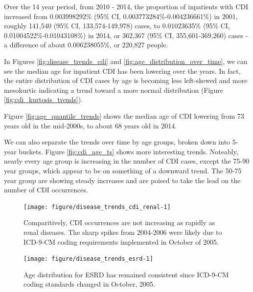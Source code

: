 \documentclass[12pt]{ociamthesis}\usepackage[]{graphicx}\usepackage[]{color}
\newenvironment{knitrout}{}{} %
\newcommand{\ci}[3]{#1 (95\% CI, #2-#3)}
\newcommand{\cip}[3]{#1\% (95\% CI, #2\%-#3\%)}
\begin{document}
Over the 14 year period, from 2010 - 2014, the proportion of inpatients with CDI increased from 
\cip{0.003998292}{0.003773284}{0.004236661} in 2001, roughly 
\ci{141,540}{133,574}{149,978} cases, to
\cip{0.01023635}{0.01004522}{0.01043108} in 2014, or
\ci{362,367}{355,601}{369,260} cases - 
a difference of about 0.006238055\%, or 220,827 people. 

In Figures \ref{fig:disease_trends_cdi} and \ref{fig:age_distribution_over_time}, we can see the median age for inpatient CDI has been lowering over the years.
In fact, the entire distribution of CDI cases by age is becoming less left-skewed and more mesokurtic indicating a trend toward a more normal distribution 
(Figure \ref{fig:cdi_kurtosis_trends}). 

Figure \ref{fig:age_quantile_trends} shows the median age of CDI lowering from 73 years old in the mid-2000s, to about 68 years old in 2014. 

We can also separate the trends over time by age groups, broken down into 5-year buckets. Figure \ref{fig:cdi_age_ts} shows more interesting trends.
Noteably, nearly every age group is increasing in the number of CDI cases, except the 75-90 year groups, which appear to be on something of a downward trend.
The 50-75 year group are showing steady increases and are poised to take the lead on the number of CDI occurrences. 


\begin{knitrout}
\color{fgcolor}\begin{figure}

{\centering \texttt{[image: figure/disease\_trends\_cdi\_renal-1]} 

}

\caption[Comparitively, CDI occurrences are not increasing as rapidly as renal diseases]{Comparitively, CDI occurrences are not increasing as rapidly as renal diseases. The sharp spikes from 2004-2006 were likely due to ICD-9-CM coding requirements implemented in October of 2005.}\label{fig:disease_trends_cdi_renal}
\end{figure}


\end{knitrout}
\label{fig:disease_trends_cdi_renal}



\begin{knitrout}
\color{fgcolor}\begin{figure}

{\centering \texttt{[image: figure/disease\_trends\_esrd-1]} 

}

\caption[Age distribution for ESRD has remained consistent since ICD-9-CM coding standards changed in October, 2005]{Age distribution for ESRD has remained consistent since ICD-9-CM coding standards changed in October, 2005.}\label{fig:disease_trends_esrd}
\end{figure}


\end{knitrout}
\label{fig:disease_trends_esrd}
\end{document}
